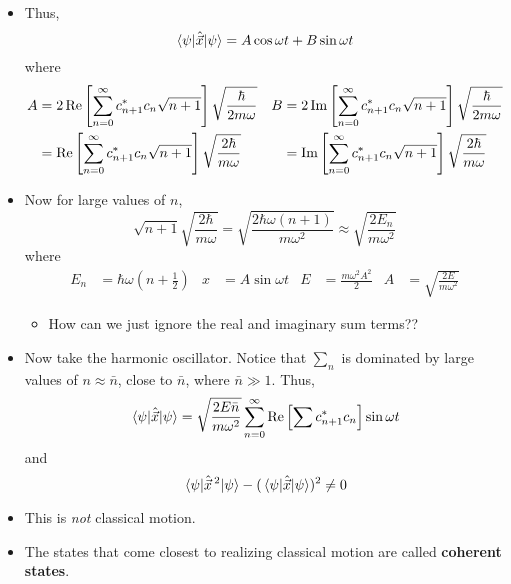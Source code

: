 \documentclass[../notes.tex]{subfiles}
\begin{document}
\begin{itemize}
\begin{itemize}
        \item Thus,
        \begin{equation*}
            \ev{\hat{\vec{x}}}{\psi} = A\cos\omega t+B\sin\omega t
        \end{equation*}
        where
        \begin{align*}
            A &= 2\operatorname{Re}\left[ \sum_{n=0}^\infty c_{n+1}^*c_n\sqrt{n+1} \right]\sqrt{\frac{\hbar}{2m\omega}}&
                B &= 2\operatorname{Im}\left[ \sum_{n=0}^\infty c_{n+1}^*c_n\sqrt{n+1} \right]\sqrt{\frac{\hbar}{2m\omega}}\\
            &= \operatorname{Re}\left[ \sum_{n=0}^\infty c_{n+1}^*c_n\sqrt{n+1} \right]\sqrt{\frac{2\hbar}{m\omega}}&
                &= \operatorname{Im}\left[ \sum_{n=0}^\infty c_{n+1}^*c_n\sqrt{n+1} \right]\sqrt{\frac{2\hbar}{m\omega}}
        \end{align*}
        \item Now for large values of $n$,
        \begin{equation*}
            \sqrt{n+1}\sqrt{\frac{2\hbar}{m\omega}} = \sqrt{\frac{2\hbar\omega(n+1)}{m\omega^2}}
            \approx \sqrt{\frac{2E_n}{m\omega^2}}
        \end{equation*}
        where
        \begin{align*}
            E_n &= \hbar\omega\left( n+\frac{1}{2} \right)&
            x &= A\sin\omega t&
            E &= \frac{m\omega^2A^2}{2}&
            A &= \sqrt{\frac{2E}{m\omega^2}}
        \end{align*}
        \begin{itemize}
            \item How can we just ignore the real and imaginary sum terms??
        \end{itemize}
        \item Now take the harmonic oscillator. Notice that $\sum_n$ is dominated by large values of $n\approx\bar{n}$, close to $\bar{n}$, where $\bar{n}\gg 1$. Thus,
        \begin{equation*}
            \ev{\hat{\vec{x}}}{\psi} = \sqrt{\frac{2E\bar{n}}{m\omega^2}}\sum_{n=0}^\infty\re\left[ \sum c_{n+1}^*c_n \right]\sin\omega t
        \end{equation*}
        and
        \begin{equation*}
            \ev{\hat{\vec{x}}{\,}^2}{\psi}-(\ev{\hat{\vec{x}}}{\psi})^2 \neq 0
        \end{equation*}
        \item This is \emph{not} classical motion.
        \item The states that come closest to realizing classical motion are called \textbf{coherent states}.

\end{itemize}
\end{itemize}
\end{document}
